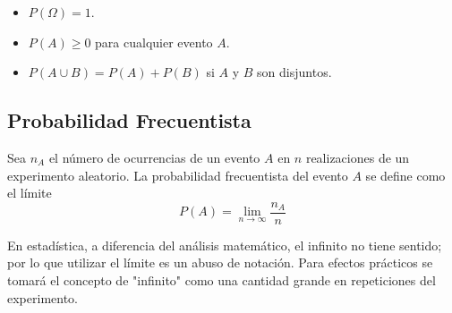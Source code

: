 \begin{itemize}
	\item $P(\Omega) = 1$.
	\item $P(A) \geq 0$ para cualquier evento $A$.
	\item $P(A\cup B) = P(A) + P(B)$ si $A$ y $B$ son disjuntos.
\end{itemize}

\subsection{Probabilidad Frecuentista}

Sea $n_A$ el número de ocurrencias de un evento $A$ en $n$ realizaciones de un experimento aleatorio. La probabilidad frecuentista del evento $A$ se define como el límite
\begin{equation}
	P(A) = \lim _{n\to \infty} \frac{n_A}{n} \label{prob_frecuentista}
\end{equation}

En estadística, a diferencia del análisis matemático, el infinito no tiene sentido; por lo que utilizar el límite es un abuso de notación. Para efectos prácticos se tomará el concepto de "infinito" como una cantidad grande en repeticiones del experimento.
















